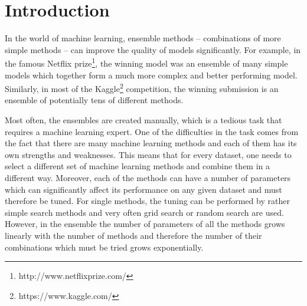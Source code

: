\documentclass{ws-ijait}
\begin{document}
\newcommand{\Pseudokod}[4]{
	\begin{figure}[!t]
	\removelatexerror
	\begin{algorithm}[H]
		\caption{\label{#4}#1}
		\DontPrintSemicolon
		\SetKwProg{Fn}{function}{}{}
		\Fn{#2}{#3}
	\end{algorithm}
	\end{figure}
}

\makeatletter
\newcommand{\removelatexerror}{\let\@latex@error\@gobble}
\makeatother



\maketitle

\begin{history}
\end{history}

\begin{abstract}
\end{abstract}


\section{Introduction}	

In the world of machine learning, ensemble methods -- combinations of more
simple methods -- can improve the quality of models significantly. For example,
in the famous Netflix prize\footnote{http://www.netflixprize.com/}, the winning
model was an ensemble of many simple models which together form a much more
complex and better performing model. Similarly, in most of the
Kaggle\footnote{https://www.kaggle.com/} competition, the winning submission is
an ensemble of potentially tens of different methods. 

Most often, the ensembles are created manually, which is a tedious task that
requires a machine learning expert. One of the difficulties in the task comes
from the fact that there are many machine learning methods and each of them has
its own strengths and weaknesses. This means that for every dataset, one needs
to select a different set of machine learning methods and combine them in a
different way. Moreover, each of the methods can have a number of parameters
which can significantly affect its performance on any given dataset and must
therefore be tuned. For single methods, the tuning can be performed by rather
simple search methods and very often grid search or random search are used.
However, in the ensemble the number of parameters of all the methods grows
linearly with the number of methods and therefore the number of their
combinations which must be tried grows exponentially. 
\end{document}
